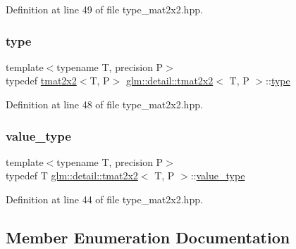 Definition at line 49 of file type\+\_\+mat2x2.\+hpp.

\mbox{\label{structglm_1_1detail_1_1tmat2x2_a8d480bfd28c81ceebb28f78aa1fc5302}} 
\subsubsection{\texorpdfstring{type}{type}}
{\footnotesize\ttfamily template$<$typename T, precision P$>$ \\
typedef \hyperlink{structglm_1_1detail_1_1tmat2x2}{tmat2x2}$<$T, P$>$ \hyperlink{structglm_1_1detail_1_1tmat2x2}{glm\+::detail\+::tmat2x2}$<$ T, P $>$\+::\hyperlink{structglm_1_1detail_1_1tmat2x2_a8d480bfd28c81ceebb28f78aa1fc5302}{type}}



Definition at line 48 of file type\+\_\+mat2x2.\+hpp.

\mbox{\label{structglm_1_1detail_1_1tmat2x2_aa592f519609fc243aa0d63a843651a88}} 
\subsubsection{\texorpdfstring{value\+\_\+type}{value\_type}}
{\footnotesize\ttfamily template$<$typename T, precision P$>$ \\
typedef T \hyperlink{structglm_1_1detail_1_1tmat2x2}{glm\+::detail\+::tmat2x2}$<$ T, P $>$\+::\hyperlink{structglm_1_1detail_1_1tmat2x2_aa592f519609fc243aa0d63a843651a88}{value\+\_\+type}}



Definition at line 44 of file type\+\_\+mat2x2.\+hpp.



\subsection{Member Enumeration Documentation}
\mbox{\label{structglm_1_1detail_1_1tmat2x2_ac7c2fd8babbf9207cf08ffb92497a6c8}} 
